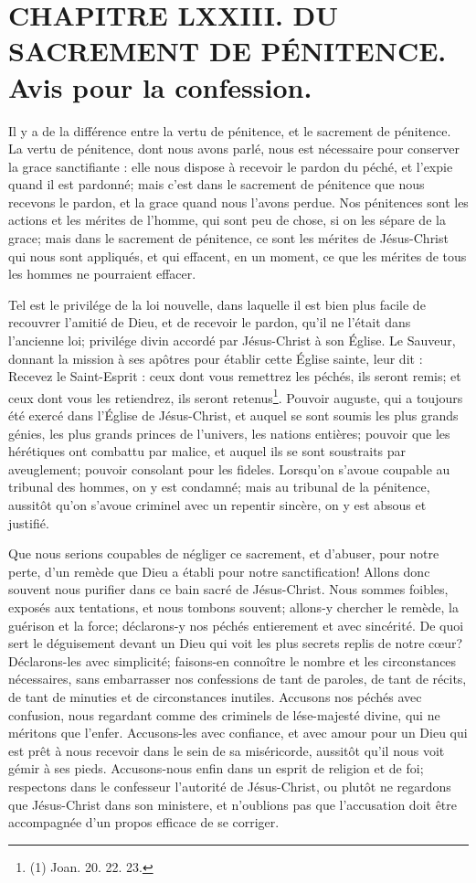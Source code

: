 \documentclass[instructions.tex]{subfiles}
\begin{document}
 
\chapter{CHAPITRE LXXIII. DU SACREMENT DE PÉNITENCE. Avis pour la confession.}
 
\primo Il y a de la différence entre la vertu de pénitence, et le sacrement de pénitence. La vertu de pénitence, dont nous avons parlé, nous est nécessaire pour conserver la grace sanctifiante : elle nous dispose à recevoir le pardon du péché, et l’expie quand il est pardonné; mais c’est dans le sacrement de pénitence que nous recevons le pardon, et la grace quand nous l’avons perdue. Nos pénitences sont les actions et les mérites de l’homme, qui sont peu de chose, si on les sépare de la grace; mais dans le sacrement de pénitence, ce sont les mérites de Jésus-Christ qui nous sont appliqués, et qui effacent, en un moment, ce que les mérites de tous les hommes ne pourraient effacer.
 
Tel est le privilége de la loi nouvelle, dans laquelle il est bien plus facile de recouvrer l’amitié de Dieu, et de recevoir le pardon, qu’il ne l’était dans l’ancienne loi; privilége divin accordé par Jésus-Christ à son Église. Le Sauveur, donnant la mission à ses apôtres pour établir cette Église sainte, leur dit : Recevez le Saint-Esprit : ceux dont vous remettrez les péchés, ils seront remis; et ceux dont vous les retiendrez, ils seront retenus\footnote{(1) Joan. 20. 22. 23.}. Pouvoir auguste, qui a toujours été exercé dans l’Église de Jésus-Christ, et auquel se sont soumis les plus grands génies, les plus grands princes de l’univers, les nations entières; pouvoir que les hérétiques ont combattu par malice, et auquel ils se sont soustraits par aveuglement; pouvoir consolant pour les fideles. Lorsqu’on s’avoue coupable au tribunal des hommes, on y est condamné; mais au tribunal de la pénitence, aussitôt qu’on s’avoue criminel avec un repentir sincère, on y est absous et justifié.
 
\secundo Que nous serions coupables de négliger ce sacrement, et d’abuser, pour notre perte, d’un remède que Dieu a établi pour notre sanctification! Allons donc souvent nous purifier dans ce bain sacré de Jésus-Christ. Nous sommes foibles, exposés aux tentations, et nous tombons souvent; allons-y chercher le remède, la guérison et la force; déclarons-y nos péchés entierement et avec sincérité. De quoi sert le déguisement devant un Dieu qui voit les plus secrets replis de notre cœur? Déclarons-les avec simplicité; faisons-en connoître le nombre et les circonstances nécessaires, sans embarrasser nos confessions de tant de paroles, de tant de récits, de tant de minuties et de circonstances inutiles. Accusons nos péchés avec confusion, nous regardant comme des criminels de lése-majesté divine, qui ne méritons que l’enfer. Accusons-les avec confiance, et avec amour pour un Dieu qui est prêt à nous recevoir dans le sein de sa miséricorde, aussitôt qu’il nous voit gémir à ses pieds. Accusons-nous enfin dans un esprit de religion et de foi; respectons dans le confesseur l’autorité de Jésus-Christ, ou plutôt ne regardons que Jésus-Christ dans son ministere, et n’oublions pas que l’accusation doit être accompagnée d’un propos efficace de se corriger.
 
\end{document}

